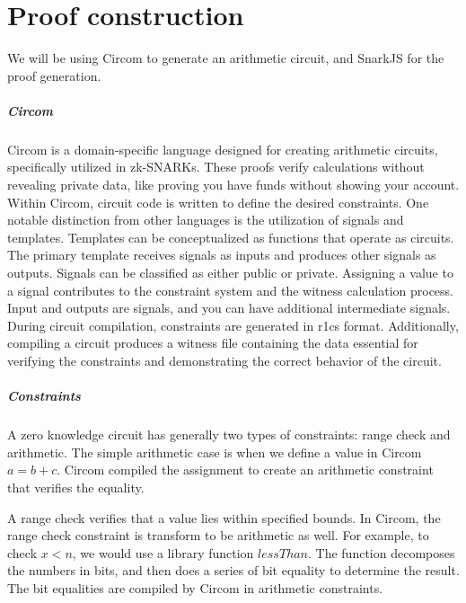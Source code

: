 
\chapter{Proof construction}
We will be using Circom to generate an arithmetic circuit, and SnarkJS for the proof generation.

\paragraph{Circom} 

Circom is a domain-specific language designed for creating arithmetic circuits, specifically utilized in zk-SNARKs. These proofs verify calculations without revealing private data, like proving you have funds without showing your account.
Within Circom, circuit code is written to define the desired constraints. One notable distinction from other languages is the utilization of signals and templates.
Templates can be conceptualized as functions that operate as circuits. The primary template receives signals as inputs and produces other signals as outputs. Signals can be classified as either public or private.
Assigning a value to a signal contributes to the constraint system and the witness calculation process.
Input and outputs are signals, and you can have additional intermediate signals.
During circuit compilation, constraints are generated in r1cs format. Additionally, compiling a circuit produces a witness file containing the data essential for verifying the constraints and demonstrating the correct behavior of the circuit.

\paragraph{Constraints} 

A zero knowledge circuit has generally two types of constraints: range check and arithmetic.
The simple arithmetic case is when we define a value in Circom $a = b + c$. Circom compiled the assignment to create an arithmetic constraint that verifies the equality.

A range check verifies that a value lies within specified bounds.
In Circom, the range check constraint is transform to be arithmetic as well. For example, to check $x<n$, we would use a library function $lessThan$.
The function decomposes the numbers in bits, and then does a series of bit equality to determine the result. The bit equalities are compiled by Circom in arithmetic constraints.


